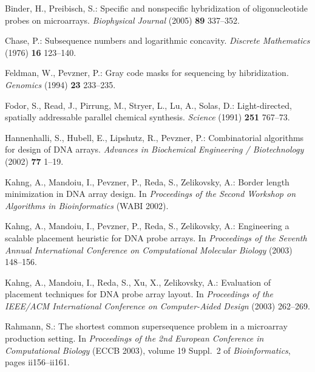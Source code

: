 \documentclass{llncs}
\begin{document}
\begin{thebibliography}{5}

Binder, H., Preibisch, S.:
Specific and nonspecific hybridization of oligonucleotide probes on microarrays.
{\it Biophysical Journal} (2005) {\bf 89} 337--352.

Chase, P.:
Subsequence numbers and logarithmic concavity.
{\it Discrete Mathematics} (1976) {\bf 16} 123--140.

Feldman, W., Pevzner, P.:
Gray code masks for sequencing by hibridization.
{\it Genomics} (1994) {\bf 23} 233--235.

Fodor, S., Read, J., Pirrung, M., Stryer, L., Lu, A., Solas, D.:
Light-directed, spatially addressable parallel chemical synthesis.
{\it Science} (1991) {\bf 251} 767--73.

Hannenhalli, S., Hubell, E., Lipshutz, R., Pevzner, P.:
Combinatorial algorithms for design of DNA arrays.
{\it Advances in Biochemical Engineering / Biotechnology} (2002) {\bf 77} 1--19.

Kahng, A., Mandoiu, I., Pevzner, P., Reda, S., Zelikovsky, A.:
Border length minimization in DNA array design.
In {\it Proceedings of the Second Workshop on Algorithms in Bioinformatics} (WABI 2002).

Kahng, A., Mandoiu, I., Pevzner, P., Reda, S., Zelikovsky, A.:
Engineering a scalable placement heuristic for DNA probe arrays.
In {\it Proceedings of the Seventh Annual International Conference on Computational Molecular Biology} (2003) 148--156.

Kahng, A., Mandoiu, I., Reda, S., Xu, X., Zelikovsky, A.:
Evaluation of placement techniques for DNA probe array layout.
In {\it Proceedings of the IEEE/ACM International Conference on Computer-Aided Design}
(2003) 262--269.

Rahmann, S.:
The shortest common supersequence problem in a microarray production setting.
In {\it Proceedings of the 2nd European Conference in Computational Biology}
({ECCB} 2003), volume 19 Suppl.~2 of {\it Bioinformatics}, pages ii156--ii161.

\end{thebibliography}
\end{document}
